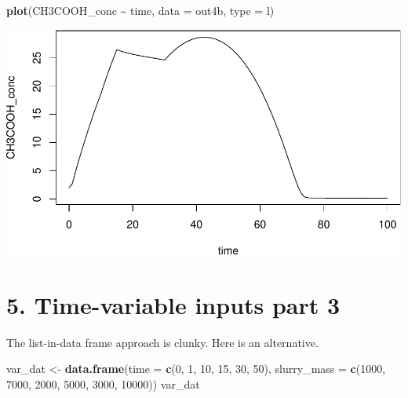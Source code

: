 \documentclass[
]{article}
\newenvironment{Shaded}{\begin{snugshade}}{\end{snugshade}}
\newcommand{\AttributeTok}[1]{\textcolor[rgb]{0.13,0.29,0.53}{#1}}
\newcommand{\DecValTok}[1]{\textcolor[rgb]{0.00,0.00,0.81}{#1}}
\newcommand{\FunctionTok}[1]{\textcolor[rgb]{0.13,0.29,0.53}{\textbf{#1}}}
\newcommand{\NormalTok}[1]{#1}
\newcommand{\OtherTok}[1]{\textcolor[rgb]{0.56,0.35,0.01}{#1}}
\newcommand{\SpecialCharTok}[1]{\textcolor[rgb]{0.81,0.36,0.00}{\textbf{#1}}}
\newcommand{\StringTok}[1]{\textcolor[rgb]{0.31,0.60,0.02}{#1}}
\begin{document}
\begin{Shaded}
\begin{Highlighting}[]
\FunctionTok{plot}\NormalTok{(CH3COOH\_conc }\SpecialCharTok{\textasciitilde{}}\NormalTok{ time, }\AttributeTok{data =}\NormalTok{ out4b, }\AttributeTok{type =} \StringTok{\textquotesingle{}l\textquotesingle{}}\NormalTok{)}
\end{Highlighting}
\end{Shaded}

\includegraphics{simple_demo_files/figure-latex/unnamed-chunk-30-4.pdf}

\hypertarget{time-variable-inputs-part-3}{%
\section{5. Time-variable inputs part
3}\label{time-variable-inputs-part-3}}

The list-in-data frame approach is clunky. Here is an alternative.

\begin{Shaded}
\begin{Highlighting}[]
\NormalTok{var\_dat }\OtherTok{\textless{}{-}} \FunctionTok{data.frame}\NormalTok{(}\AttributeTok{time =} \FunctionTok{c}\NormalTok{(}\DecValTok{0}\NormalTok{, }\DecValTok{1}\NormalTok{, }\DecValTok{10}\NormalTok{, }\DecValTok{15}\NormalTok{, }\DecValTok{30}\NormalTok{, }\DecValTok{50}\NormalTok{), }
                      \AttributeTok{slurry\_mass =} \FunctionTok{c}\NormalTok{(}\DecValTok{1000}\NormalTok{, }\DecValTok{7000}\NormalTok{, }\DecValTok{2000}\NormalTok{, }\DecValTok{5000}\NormalTok{, }\DecValTok{3000}\NormalTok{, }\DecValTok{10000}\NormalTok{))}
\NormalTok{var\_dat}
\end{Highlighting}
\end{Shaded}
\end{document}
